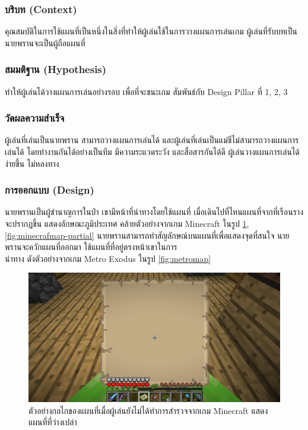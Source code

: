 \subsubsection{บริบท (Context)}
คุณสมบัติในการใช้แผนที่เป็นหนึ่งในสิ่งที่ทำให้ผู้เล่นใช้ในการวางแผนการเล่นเกม ผู้เล่นที่รับบทเป็นนายพรานจะเป็นผู้ถือแผนที่


\subsubsection{สมมติฐาน (Hypothesis)}
ทำให้ผู้เล่นได้วางแผนการเล่นอย่างรอบ เพื่อที่จะชนะเกม  สัมพันธ์กับ Design Pillar ที่ 1, 2, 3

\subsubsection{วัดผลความสำเร็จ}
ผู้เล่นที่เล่นเป็นนายพราน สามารถวางแผนการเล่นได้ และผู้เล่นที่เล่นเป็นแม่ชีไม่สามารถวางแผนการเล่นได้ โดยทำงานกันได้อย่างเป็นทีม มีความระแวดระวัง และสื่อสารกันได้ดี ผู้เล่นวางแผนการเล่นได้ง่ายขึ้น ไม่หลงทาง

\subsubsection{การออกแบบ (Design)}

นายพรานเป็นผู้ชำนาญการในป่า เขามีหน้าที่นำทางโดยใช้แผนที่ เมื่อเดินไปที่ไหนแผนที่จากที่เรือนรางจะปรากฏขึ้น แสดงลักษณะภูมิประเทศ คล้ายตัวอย่างจากเกม Minecraft ในรูป \ref{fig:minecrafmap-blank}, \ref{fig:minecrafmap-partial} นายพรานสามารถทำสัญลักษณ์บนแผนที่เพื่อแสดงจุดที่สนใจ นายพรานจะควักแผนที่ออกมา ใช้แผนที่ที่อยู่ตรงหน้าเขาในการ \\ นำทาง ดังตัวอย่างจากเกม Metro Exodus ในรูป \ref{fig:metromap}

\begin{figure}[h]
  \begin{center}
  \includegraphics[width=\textwidth]{./img/minecraftmap-blank.png}
  \end{center}
  \caption[ตัวอย่างกลไกของแผนที่เมื่อผู้เล่นยังไม่ได้ทำการสำรวจจากเกม Minecraft]{ตัวอย่างกลไกของแผนที่เมื่อผู้เล่นยังไม่ได้ทำการสำรวจจากเกม Minecraft แสดงแผนที่ที่ว่างเปล่า}
  \label{fig:minecrafmap-blank}
\end{figure}



